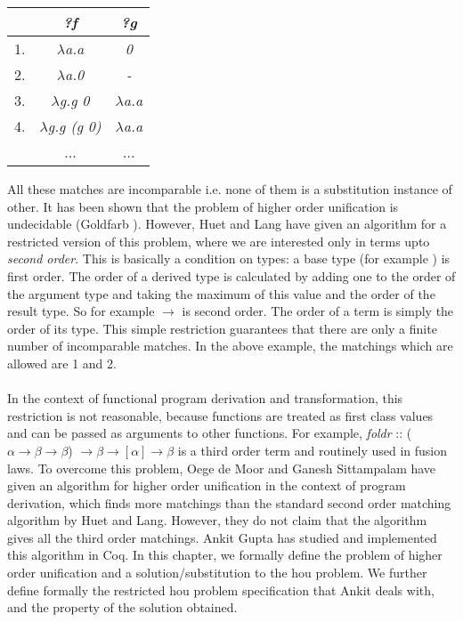 \begin{center}
\begin{tabular}{ | c | c | c | } 
\hline
  & \emph{\textbf{?f}} & \emph{\textbf{?g}} \\
\hline
  1. & \emph{$\lambda$a.a} & \emph{0} \\
\hline
  2. & \emph{$\lambda$a.0} & \emph{-} \\
\hline
  3. & \emph{$\lambda$g.g 0} & \emph{$\lambda$a.a} \\
\hline
  4. & \emph{$\lambda$g.g (g 0)} & \emph{$\lambda$a.a} \\
\hline
  & ... & ... \\
\hline
\end{tabular}
\end{center}

\noindent
All these matches are incomparable i.e. none of them is a substitution instance of other. It has been shown that the problem of higher order unification is undecidable (Goldfarb \cite{goldfarb1981undecidability}). However, Huet and Lang have given an algorithm \cite{huet1978proving} for a restricted version of this problem, where we are interested only in terms upto \emph{second order}. This is basically a condition on types: a base type (for example  ) is first order. The order of a derived type is calculated by adding one to the order of the argument type and taking the maximum of this value and the order of the result type. So for example  $\rightarrow$  is second order. The order of a term is simply the order of its type. This simple restriction guarantees that there are only a finite number of incomparable matches. In the above example, the matchings which are allowed are 1 and 2.\\\\
In the context of functional program derivation and transformation, this restriction is not reasonable, because functions are treated as first class values and can be passed as arguments to other functions. For example, \emph{foldr} :: ($\alpha \rightarrow \beta \rightarrow \beta $) $\rightarrow \beta \rightarrow [\alpha] \rightarrow \beta$ is a third order term and routinely used in fusion laws. To overcome this problem, Oege
de Moor and Ganesh Sittampalam have given an algorithm for higher order unification \cite{de2001higher} in the context of program derivation, which finds more matchings than the standard second order matching algorithm by Huet and Lang. However, they do not claim that the algorithm gives all the third order matchings. Ankit Gupta has studied and implemented this algorithm in Coq. In this chapter, we formally define the problem of higher order unification and a solution/substitution to the hou problem. We further define formally the restricted hou problem specification that Ankit deals with, and the property of the solution obtained.


